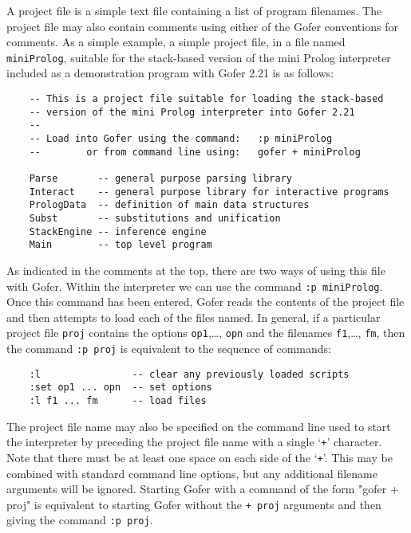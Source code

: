 A project file is a simple text file containing a list of program
filenames.  The project file may also contain comments using either of
the Gofer conventions for comments.  As a simple example, a simple
project file, in a file named \verb"miniProlog", suitable for the
stack-based version of the mini Prolog interpreter included as a
demonstration program with Gofer 2.21 is as follows:
\begin{verbatim}
    -- This is a project file suitable for loading the stack-based
    -- version of the mini Prolog interpreter into Gofer 2.21
    --
    -- Load into Gofer using the command:   :p miniProlog
    --        or from command line using:   gofer + miniProlog

    Parse       -- general purpose parsing library
    Interact    -- general purpose library for interactive programs
    PrologData  -- definition of main data structures
    Subst       -- substitutions and unification
    StackEngine -- inference engine
    Main        -- top level program
\end{verbatim}
As indicated in the comments at the top, there are two ways of using
this file with Gofer.  Within the interpreter we can use the command
\verb":p miniProlog".  Once this command has been entered, Gofer reads the
contents of the project file and then attempts to load each of the
files named.  In general, if a particular project file \verb"proj" contains
the options \verb"op1",\dots, \verb"opn" and the filenames 
\verb"f1",\dots, \verb"fm", then the
command \verb":p proj" is equivalent to the sequence of commands:
\begin{verbatim}
    :l                -- clear any previously loaded scripts
    :set op1 ... opn  -- set options
    :l f1 ... fm      -- load files
\end{verbatim}
The project file name may also be specified on the command line used to
start the interpreter by preceding the project file name with a single
`\verb"+"' character.  Note that there must be at least one space on each side
of the `\verb"+"'.  This may be combined with standard command line options,
but any additional filename arguments will be ignored.  Starting Gofer
with a command of the form "gofer + proj" is equivalent to starting
Gofer without the \verb"+ proj" arguments and then giving the command
\verb":p proj".


